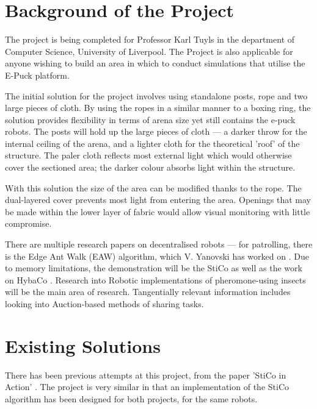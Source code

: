 \section{Background of the Project}
The project is being completed for Professor Karl Tuyls in the
department of Computer Science, University of Liverpool.
The Project is also applicable for anyone wishing to build an area in which to
conduct simulations that utilise the E-Puck platform\cite{ePuckSite}.

The initial solution for the project involves using standalone posts, rope and
two large pieces of cloth.  By using the ropes in a similar manner to a boxing
ring, the solution provides flexibility in terms of arena size yet still 
contains the e-puck robots.  The posts will hold up the large pieces of cloth
--- a darker throw for the internal ceiling of the arena, and a lighter cloth
for the theoretical 'roof' of the structure.  The paler cloth reflects most 
external light which would otherwise cover the sectioned
area; the darker colour absorbs light within the structure.

With this solution the size of the area can be modified thanks to the rope.
The dual-layered cover prevents most light from entering the area.
Openings that may be made within the lower layer of fabric would allow
visual monitoring with little compromise.

There are multiple research papers on decentralised robots --- for patrolling,
there is the Edge Ant Walk (EAW) algorithm, which V. Yanovski has worked on
\cite{Yanovski2003}.  Due to memory limitations, the demonstration will be 
the StiCo\cite{Ranjbar-Sahraei2012} as well as the work on HybaCo
\cite{Broecker2015}.  Research into Robotic implementations of pheromone-using
insects will be the main area of
research\cite{Yanovski2003,Ranjbar-Sahraei2012,Broecker2015}.
Tangentially relevant information includes looking into Auction-based
methods of sharing tasks\cite{Schneider2015}.

\section{Existing Solutions}
There has been previous attempts at this project, from the paper 'StiCo in
Action' \cite{Ranjbar-Sahraei2013Demo}.  The project is very similar in
that an implementation of the StiCo algorithm has been designed for both
projects, for the same robots.

